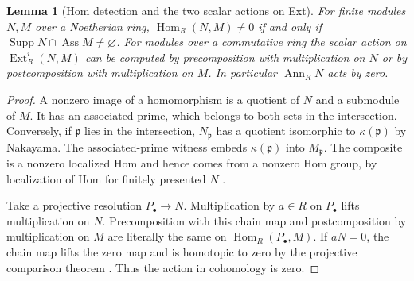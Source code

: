 \documentclass[11pt,oneside,openany]{book}
\newtheorem{lemma}[theorem]{Lemma}
\theoremstyle{definition}
\theoremstyle{remark}
\begin{document}
\begin{lemma}[Hom detection and the two scalar actions on Ext]
\label{res:DP-03}
For finite modules $N,M$ over a Noetherian ring,
$\operatorname{Hom}_R(N,M)\ne0$ if and only if
$\operatorname{Supp}N\cap\operatorname{Ass}M\ne\varnothing$.
For modules over a commutative ring the scalar action on
$\operatorname{Ext}^i_R(N,M)$ can be computed by precomposition
with multiplication on $N$ or by postcomposition with multiplication
on $M$. In particular $\operatorname{Ann}_R N$ acts by zero.
\end{lemma}
\begin{proof}
A nonzero image of a homomorphism is a quotient of $N$ and a submodule
of $M$. It has an associated prime, which belongs to both sets in the
intersection. Conversely, if $\mathfrak p$ lies in the intersection,
$N_{\mathfrak p}$ has a quotient isomorphic to $\kappa(\mathfrak p)$
by Nakayama. The associated-prime witness embeds
$\kappa(\mathfrak p)$ into $M_{\mathfrak p}$. The composite is a
nonzero localized Hom and hence comes from a nonzero Hom group,
by localization of Hom for finitely presented $N$
\cite[Theorems ALG-05-C02-R01 and ALG-10-C03-S03]{p103}.

Take a projective resolution $P_\bullet\to N$. Multiplication by
$a\in R$ on $P_\bullet$ lifts multiplication on $N$. Precomposition
with this chain map and postcomposition by multiplication on $M$
are literally the same on $\operatorname{Hom}_R(P_\bullet,M)$.
If $aN=0$, the chain map lifts the zero map and is homotopic to zero
by the projective comparison theorem
\cite[Theorem ALG-10-C02-R02]{p103}. Thus the action in cohomology is
zero.
\end{proof}
\end{document}
